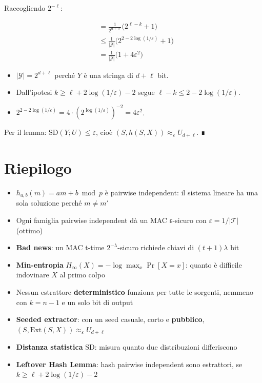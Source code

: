 Raccogliendo \(2^{-\ell}\):

\[
\begin{aligned}
&= \frac{1}{2^{d+\ell}} \Big( 2^{\ell - k} + 1 \Big) \\
&\le \frac{1}{|\mathcal{Y}|} \Big( 2^{2 - 2\log(1/\varepsilon)} + 1 \Big) \\
&= \frac{1}{|\mathcal{Y}|} \Big( 1 + 4\varepsilon^2 \Big)
\end{aligned}
\]

\begin{itemize}
\tightlist
\item
  \(|\mathcal{Y}| = 2^{d+\ell}\) perché \(Y\) è una stringa di \(d + \ell\) bit.
\item
  Dall'ipotesi \(k \ge \ell + 2\log(1/\varepsilon) - 2\) segue \(\ell - k \le 2 - 2\log(1/\varepsilon)\).
\item
  \(2^{2 - 2\log(1/\varepsilon)} = 4 \cdot (2^{\log(1/\varepsilon)})^{-2} = 4\varepsilon^2\).
\end{itemize}

Per il lemma: \(\text{SD}(Y; U) \le \varepsilon\), cioè \((S, h(S, X)) \approx_\varepsilon U_{d+\ell}\). ∎

\section{Riepilogo}

\begin{itemize}
\tightlist
\item
  \(h_{a,b}(m) = am + b \bmod p\) è pairwise independent: il sistema lineare ha una sola soluzione perché \(m \ne m'\)
\item
  Ogni famiglia pairwise independent dà un MAC ε-sicuro con \(\varepsilon = 1/|\mathcal{T}|\) (ottimo)
\item
  \textbf{Bad news}: un MAC t-time \(2^{-\lambda}\)-sicuro richiede chiavi di \((t+1)\lambda\) bit
\item
  \textbf{Min-entropia} \(H_\infty(X) = -\log \max_x \Pr[X = x]\): quanto è difficile indovinare \(X\) al primo colpo
\item
  Nessun estrattore \textbf{deterministico} funziona per tutte le sorgenti, nemmeno con \(k = n - 1\) e un solo bit di output
\item
  \textbf{Seeded extractor}: con un seed casuale, corto e \textbf{pubblico}, \((S, \text{Ext}(S, X)) \approx_\varepsilon U_{d+\ell}\)
\item
  \textbf{Distanza statistica} \(\text{SD}\): misura quanto due distribuzioni differiscono
\item
  \textbf{Leftover Hash Lemma}: hash pairwise independent sono estrattori, se \(k \ge \ell + 2\log(1/\varepsilon) - 2\)
\end{itemize}
